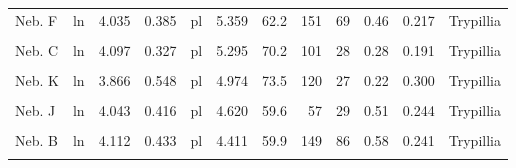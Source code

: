 \documentclass[
  12pt,
  a4paper, twoside]{book}
\begin{document}
\begin{landscape}
\begin{table}
\begin{tabular}[t]{llrrlrrrrrrl}
Neb. F & ln & 4.035 & 0.385 & pl & 5.359 & 62.2 & 151 & 69 & 0.46 & 0.217 & Trypillia\\
\cellcolor{gray!6}{Vráble N} & \cellcolor{gray!6}{ln} & \cellcolor{gray!6}{4.215} & \cellcolor{gray!6}{0.358} & \cellcolor{gray!6}{pl} & \cellcolor{gray!6}{5.350} & \cellcolor{gray!6}{80.6} & \cellcolor{gray!6}{124} & \cellcolor{gray!6}{41} & \cellcolor{gray!6}{0.33} & \cellcolor{gray!6}{0.208} & \cellcolor{gray!6}{Linear Pottery}\\
Neb. C & ln & 4.097 & 0.327 & pl & 5.295 & 70.2 & 101 & 28 & 0.28 & 0.191 & Trypillia\\
\addlinespace
\cellcolor{gray!6}{Neb. L} & \cellcolor{gray!6}{ln} & \cellcolor{gray!6}{4.040} & \cellcolor{gray!6}{0.501} & \cellcolor{gray!6}{pl} & \cellcolor{gray!6}{5.285} & \cellcolor{gray!6}{68.6} & \cellcolor{gray!6}{126} & \cellcolor{gray!6}{54} & \cellcolor{gray!6}{0.43} & \cellcolor{gray!6}{0.255} & \cellcolor{gray!6}{Trypillia}\\
Neb. K & ln & 3.866 & 0.548 & pl & 4.974 & 73.5 & 120 & 27 & 0.22 & 0.300 & Trypillia\\
\cellcolor{gray!6}{Neb. I} & \cellcolor{gray!6}{ln} & \cellcolor{gray!6}{4.113} & \cellcolor{gray!6}{0.393} & \cellcolor{gray!6}{pl} & \cellcolor{gray!6}{4.832} & \cellcolor{gray!6}{63.0} & \cellcolor{gray!6}{104} & \cellcolor{gray!6}{49} & \cellcolor{gray!6}{0.47} & \cellcolor{gray!6}{0.218} & \cellcolor{gray!6}{Trypillia}\\
Neb. J & ln & 4.043 & 0.416 & pl & 4.620 & 59.6 & 57 & 29 & 0.51 & 0.244 & Trypillia\\
\cellcolor{gray!6}{Neb. H} & \cellcolor{gray!6}{ln} & \cellcolor{gray!6}{4.175} & \cellcolor{gray!6}{0.390} & \cellcolor{gray!6}{pl} & \cellcolor{gray!6}{4.451} & \cellcolor{gray!6}{60.8} & \cellcolor{gray!6}{106} & \cellcolor{gray!6}{63} & \cellcolor{gray!6}{0.59} & \cellcolor{gray!6}{0.221} & \cellcolor{gray!6}{Trypillia}\\
\addlinespace
Neb. B & ln & 4.112 & 0.433 & pl & 4.411 & 59.9 & 149 & 86 & 0.58 & 0.241 & Trypillia\\
\cellcolor{gray!6}{Neb. M} & \cellcolor{gray!6}{ln} & \cellcolor{gray!6}{3.985} & \cellcolor{gray!6}{0.466} & \cellcolor{gray!6}{pl} & \cellcolor{gray!6}{3.614} & \cellcolor{gray!6}{50.3} & \cellcolor{gray!6}{60} & \cellcolor{gray!6}{34} & \cellcolor{gray!6}{0.57} & \cellcolor{gray!6}{0.271} & \cellcolor{gray!6}{Trypillia}\\
\bottomrule
\end{tabular}
\end{table}
\end{landscape}
\end{document}
